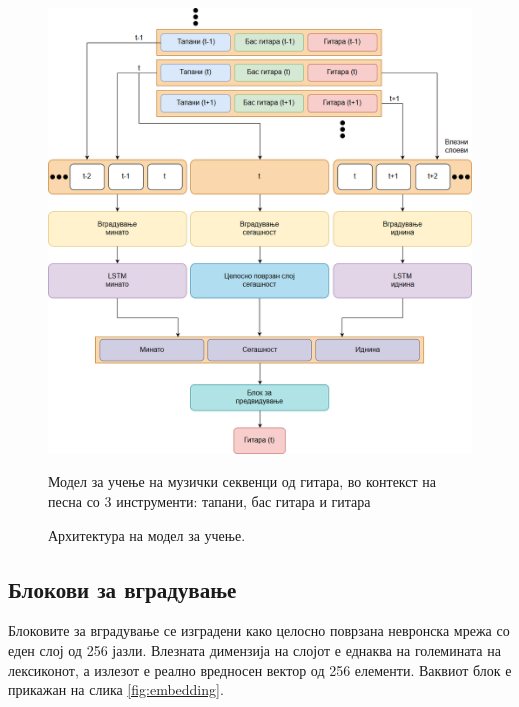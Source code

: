 \begin{figure}[H]
	\centering
    \includegraphics[scale=0.42]{images/arch.png}
	\caption{Архитектура на модел за учење.}
	Модел за учење на музички секвенци од гитара, во контекст на песна со 3 инструменти: тапани, бас гитара и гитара
	\label{fig:architecture}
\end{figure}


\subsection{Блокови за вградување}

Блоковите за вградување се изградени како целосно поврзана невронска мрежа со еден слој од 256 јазли. Влезната димензија на слојот е еднаква на големината на лексиконот, а излезот е реално вредносен вектор од 256 елементи. Ваквиот блок е прикажан на слика \ref{fig:embedding}.

